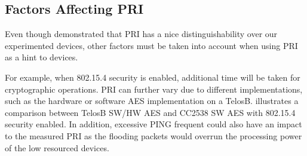 \subsection{Factors Affecting PRI} \label{PingDevice}

Even though  demonstrated that PRI has a nice distinguishability over our experimented devices, other factors must be taken into account when using PRI as a hint to devices. 

For example, when 802.15.4 security\cite{802154} is enabled, additional time will be taken for cryptographic operations. PRI can further vary due to different implementations, such as the hardware or software AES implementation on a TelosB.  illustrates a comparison between TelosB SW/HW AES and CC2538 SW AES with 802.15.4 security enabled. In addition, excessive PING frequent could also have an impact to the measured PRI as the flooding packets would overrun the processing power of the low resourced devices.

